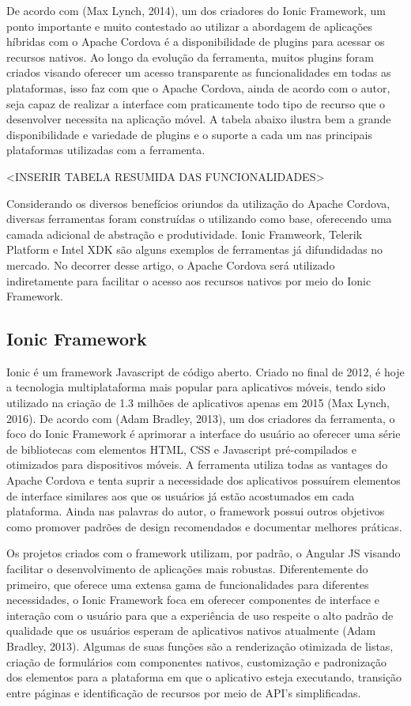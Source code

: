 De acordo com (Max Lynch, 2014), um dos criadores do Ionic Framework, um ponto importante e muito contestado ao utilizar a abordagem de aplicações híbridas com o Apache Cordova é a disponibilidade de plugins para acessar os recursos nativos. Ao longo da evolução da ferramenta, muitos plugins foram criados visando oferecer um acesso transparente as funcionalidades em todas as plataformas, isso faz com que o Apache Cordova, ainda de acordo com o autor, seja capaz de realizar a interface com praticamente todo tipo de recurso que o desenvolver necessita na aplicação móvel. A tabela abaixo ilustra bem a grande disponibilidade e variedade de plugins e o suporte a cada um nas principais plataformas utilizadas com a ferramenta. 

<INSERIR TABELA RESUMIDA DAS FUNCIONALIDADES>

Considerando os diversos benefícios oriundos da utilização do Apache Cordova, diversas ferramentas foram construídas o utilizando como base, oferecendo uma camada adicional de abstração e produtividade. Ionic Framweork, Telerik Platform e Intel XDK são alguns exemplos de ferramentas já difundidadas no mercado. No decorrer desse artigo, o Apache Cordova será utilizado indiretamente para facilitar o acesso aos recursos nativos por meio do Ionic Framework.
\subsection{\esp Ionic Framework}

Ionic é um framework Javascript de código aberto. Criado no final de 2012, é hoje a tecnologia multiplataforma mais popular para aplicativos móveis, tendo sido utilizado na criação de 1.3 milhões de aplicativos apenas em 2015 (Max Lynch, 2016). De acordo com (Adam Bradley, 2013), um dos criadores da ferramenta, o foco do Ionic Framework é aprimorar a interface do usuário ao oferecer uma série de bibliotecas com elementos HTML, CSS e Javascript pré-compilados e otimizados para dispositivos móveis. A ferramenta utiliza todas as vantages do Apache Cordova e tenta suprir a necessidade dos aplicativos possuírem elementos de interface similares aos que os usuários já estão acostumados em cada plataforma. Ainda nas palavras do autor, o framework possui outros objetivos como promover padrões de design recomendados e documentar melhores práticas.

Os projetos criados com o framework utilizam, por padrão, o Angular JS visando facilitar o desenvolvimento de aplicações mais robustas. Diferentemente do primeiro, que oferece uma extensa gama de funcionalidades para diferentes necessidades, o Ionic Framework foca em oferecer componentes de interface e interação com o usuário para que a experiência de uso respeite o alto padrão de qualidade que os usuários esperam de aplicativos nativos atualmente (Adam Bradley, 2013). Algumas de suas funções são a renderização otimizada de listas, criação de formulários com componentes nativos, customização e padronização dos elementos para a plataforma em que o aplicativo esteja executando, transição entre páginas e identificação de recursos por meio de API's simplificadas.

